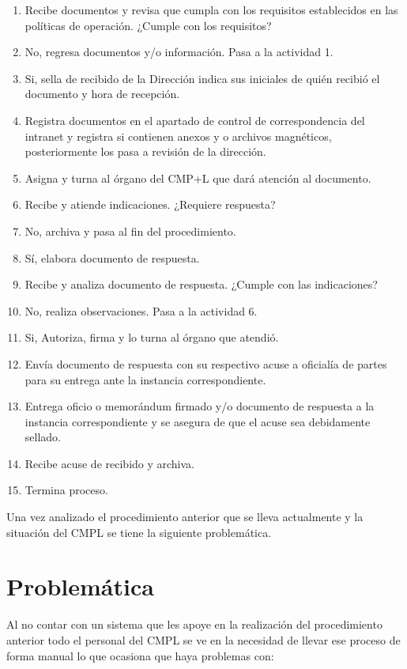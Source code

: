 \begin{enumerate}
		\item Recibe documentos y revisa que cumpla con los requisitos establecidos en las políticas de operación. ¿Cumple con los requisitos?
		\item No, regresa documentos y/o información. Pasa a la actividad 1.
		\item Si, sella de recibido de la Dirección indica sus iniciales de quién recibió el documento y hora de recepción.
		\item Registra documentos en el apartado de control de correspondencia del intranet y registra si contienen anexos y o archivos magnéticos, posteriormente los pasa a revisión de la dirección.
		\item Asigna y turna al órgano del CMP+L que dará atención al documento.
		\item Recibe y atiende indicaciones. ¿Requiere respuesta?
		\item No, archiva y pasa al fin del procedimiento.
		\item Sí, elabora documento de respuesta.
		\item Recibe y analiza documento de respuesta. ¿Cumple con las indicaciones?
		\item  No, realiza observaciones. Pasa a la actividad 6.
		\item Si, Autoriza, firma y lo turna al órgano que atendió.
		\item  Envía documento de respuesta con su respectivo acuse a oficialía de partes para su entrega ante la instancia correspondiente.
		\item Entrega oficio o memorándum firmado y/o documento de respuesta a la instancia correspondiente y se asegura de que el acuse sea debidamente sellado.
		\item Recibe acuse de recibido y archiva.
		\item Termina proceso.
	\end{enumerate}
	
Una vez analizado el procedimiento anterior que se lleva actualmente y la situación del CMPL se tiene la siguiente problemática. 

\section{Problemática}

Al no contar con un sistema que les apoye en la realización del procedimiento anterior todo el personal del CMPL se ve en la necesidad de llevar ese proceso de forma manual lo que ocasiona que haya problemas con: \\

